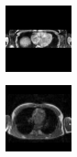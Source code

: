 \begin{figure}[htbp]
\begin{subfigure}[b]{0.25\textwidth}
        \end{subfigure}%
        \begin{subfigure}[b]{0.25\textwidth}
                \centering
                \includegraphics[width=.95\linewidth]{img_hyperopt/Abdomen_5115}
        \end{subfigure}%
        \begin{subfigure}[b]{0.25\textwidth}
                \centering
                \includegraphics[width=.95\linewidth]{img_hyperopt/Chest_6810}
        \end{subfigure}
        

\end{figure}
